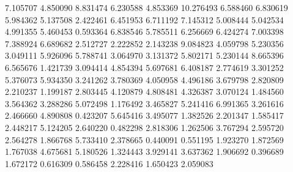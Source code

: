 7.105707
4.850090
8.831474
6.230588
4.853369
10.276493
6.588460
6.830619
5.984362
5.137508
2.422461
6.451953
6.711192
7.145312
5.008444
5.042534
4.991355
5.460453
0.593364
6.838546
5.785511
6.256669
6.424274
7.003398
7.388924
6.689682
2.512727
2.222852
2.143238
9.084823
4.059798
5.230356
3.049111
5.926096
5.788741
3.064970
3.131372
5.802171
5.230144
8.665396
6.565676
1.421739
3.094414
4.854394
5.697681
6.408187
2.774619
3.301252
5.376073
5.934350
3.241262
3.780369
4.050958
4.496186
3.679798
2.820809
2.210237
1.199187
2.803445
4.120879
4.808481
4.326387
3.070124
1.484560
3.564362
3.288286
5.072498
1.176492
3.465827
5.241416
6.991365
3.261616
2.466660
4.890808
0.423207
5.645416
3.495077
1.382526
2.201347
1.585417
2.448217
5.124205
2.640220
0.482298
2.818306
1.262506
3.767294
2.595720
2.564278
1.866768
5.733410
2.378665
0.440091
0.551195
1.923270
1.872569
1.767038
4.675681
5.180526
1.324443
3.929141
3.637362
1.906692
0.396689
1.672172
0.616309
0.586458
2.228416
1.650423
2.059083
